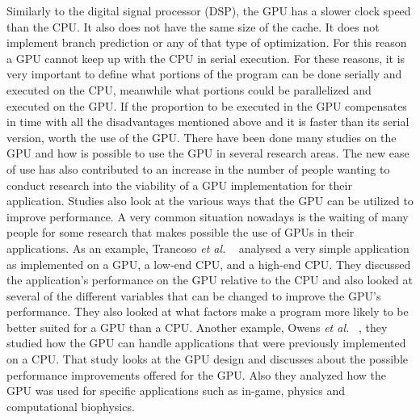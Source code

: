 \documentclass[Ingles]{ic-tese-v1}
\newcommand{\etal}{{\em et al. }}
\begin{document}
Similarly to the digital signal processor (DSP), the GPU has a slower clock speed than the CPU. It also does not have the same size of the cache. It does not implement branch prediction or any of that type of optimization. For this reason a GPU cannot keep up with the CPU in serial execution.
For these reasons, it is very important to define what portions of the program can be done serially and executed on the CPU, meanwhile what portions could be parallelized and executed on the GPU. If the proportion to be executed in the GPU compensates in time with all the disadvantages mentioned above and it is faster than its serial version, worth the use of the GPU.
There have been done many studies on the GPU and how is possible to use the GPU in several research areas. The new ease of use has also contributed to an increase in the number of people wanting to conduct research into the viability of a GPU implementation for their application. Studies also look at the various ways that the GPU can be utilized to improve performance. A very common situation nowadays is the waiting of many people for some research that makes possible the use of GPUs in their applications.
As an example, Trancoso \etal~\cite{Trancoso2005} analysed a very simple application as implemented on a GPU, a low-end CPU, and a high-end CPU. They discussed the application’s performance on the GPU relative to the CPU and also looked at several of the different variables that can be changed to improve the GPU’s performance. They also looked at what factors make a program more likely to be better suited for a GPU than a CPU.
Another example, Owens \etal~\cite{Owens2008}, they studied how the GPU can handle applications that were previously implemented on a CPU. That study looks at the GPU design and discusses about the possible performance improvements offered for the GPU. Also they analyzed how the GPU was used for specific applications such as in-game, physics and computational biophysics.
\end{document}
